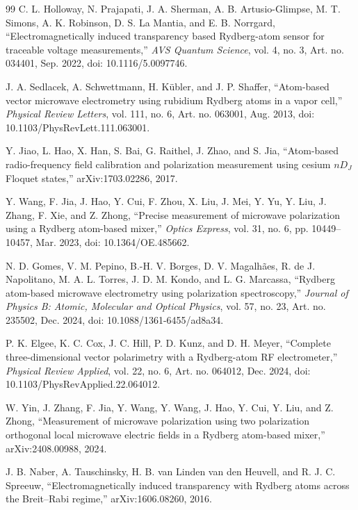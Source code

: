 \documentclass{ieeeaccess}
\begin{document}
\begin{thebibliography}{99}
C. L. Holloway, N. Prajapati, J. A. Sherman, A. B. Artusio-Glimpse, M. T. Simons, A. K. Robinson, D. S. La Mantia, and E. B. Norrgard, ``Electromagnetically induced transparency based Rydberg-atom sensor for traceable voltage measurements,'' \emph{AVS Quantum Science}, vol. 4, no. 3, Art. no. 034401, Sep. 2022, doi: 10.1116/5.0097746.

J. A. Sedlacek, A. Schwettmann, H. K{\"u}bler, and J. P. Shaffer, ``Atom-based vector microwave electrometry using rubidium Rydberg atoms in a vapor cell,'' \emph{Physical Review Letters}, vol. 111, no. 6, Art. no. 063001, Aug. 2013, doi: 10.1103/PhysRevLett.111.063001.

Y. Jiao, L. Hao, X. Han, S. Bai, G. Raithel, J. Zhao, and S. Jia, ``Atom-based radio-frequency field calibration and polarization measurement using cesium \(nD_J\) Floquet states,'' arXiv:1703.02286, 2017.

Y. Wang, F. Jia, J. Hao, Y. Cui, F. Zhou, X. Liu, J. Mei, Y. Yu, Y. Liu, J. Zhang, F. Xie, and Z. Zhong, ``Precise measurement of microwave polarization using a Rydberg atom-based mixer,'' \emph{Optics Express}, vol. 31, no. 6, pp. 10449--10457, Mar. 2023, doi: 10.1364/OE.485662.

N. D. Gomes, V. M. Pepino, B.-H. V. Borges, D. V. Magalh{\~a}es, R. de J. Napolitano, M. A. L. Torres, J. D. M. Kondo, and L. G. Marcassa, ``Rydberg atom-based microwave electrometry using polarization spectroscopy,'' \emph{Journal of Physics B: Atomic, Molecular and Optical Physics}, vol. 57, no. 23, Art. no. 235502, Dec. 2024, doi: 10.1088/1361-6455/ad8a34.

P. K. Elgee, K. C. Cox, J. C. Hill, P. D. Kunz, and D. H. Meyer, ``Complete three-dimensional vector polarimetry with a Rydberg-atom RF electrometer,'' \emph{Physical Review Applied}, vol. 22, no. 6, Art. no. 064012, Dec. 2024, doi: 10.1103/PhysRevApplied.22.064012.

W. Yin, J. Zhang, F. Jia, Y. Wang, Y. Wang, J. Hao, Y. Cui, Y. Liu, and Z. Zhong, ``Measurement of microwave polarization using two polarization orthogonal local microwave electric fields in a Rydberg atom-based mixer,'' arXiv:2408.00988, 2024.

J. B. Naber, A. Tauschinsky, H. B. van Linden van den Heuvell, and R. J. C. Spreeuw, ``Electromagnetically induced transparency with Rydberg atoms across the Breit--Rabi regime,'' arXiv:1606.08260, 2016.


\end{thebibliography}
\end{document}
